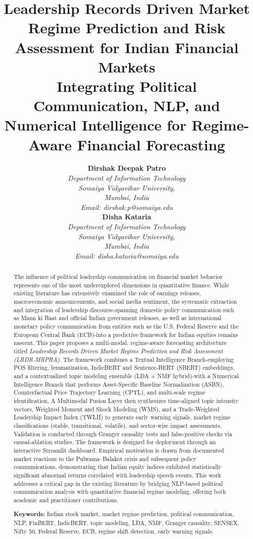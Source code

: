 \documentclass[11pt]{article}
\title{\textbf{Leadership Records Driven Market Regime Prediction and Risk Assessment for Indian Financial Markets} \\ \large Integrating Political Communication, NLP, and Numerical Intelligence for Regime-Aware Financial Forecasting}
\author{
\begin{minipage}[t]{0.45\textwidth}
\centering
\textbf{Dirshak Deepak Patro}\\[2pt]
\textit{Department of Information Technology}\\
\textit{Somaiya Vidyavihar University,}\\
\textit{Mumbai, India}\\
\textit{Email: dirshak.p@somaiya.edu}
\end{minipage}
\hfill
\begin{minipage}[t]{0.45\textwidth}
\centering
\textbf{Disha Kataria}\\[2pt]
\textit{Department of Information Technology}\\
\textit{Somaiya Vidyavihar University,}\\
\textit{Mumbai, India}\\
\textit{Email: disha.kataria@somaiya.edu}
\end{minipage}
}
\begin{document}
\maketitle

\begin{abstract}
The influence of political leadership communication on financial market behavior represents one of the most underexplored dimensions in quantitative finance. While existing literature has extensively examined the role of earnings releases, macroeconomic announcements, and social media sentiment, the systematic extraction and integration of leadership discourse-spanning domestic policy communication such as Mann ki Baat and official Indian government releases, as well as international monetary policy communication from entities such as the U.S. Federal Reserve and the European Central Bank (ECB)-into a predictive framework for Indian equities remains nascent. This paper proposes a multi-modal, regime-aware forecasting architecture titled \textit{Leadership Records Driven Market Regime Prediction and Risk Assessment (LRDR-MRPRA)}. The framework combines a Textual Intelligence Branch-employing POS filtering, lemmatization, IndicBERT and Sentence-BERT (SBERT) embeddings, and a contextualized topic modeling ensemble (LDA + NMF hybrid)-with a Numerical Intelligence Branch that performs Asset-Specific Baseline Normalization (ASBN), Counterfactual Price Trajectory Learning (CPTL), and multi-scale regime identification. A Multimodal Fusion Layer then synthesizes time-aligned topic intensity vectors, Weighted Moment and Shock Modeling (WMS), and a Trade-Weighted Leadership Impact Index (TWLII) to generate early warning signals, market regime classifications (stable, transitional, volatile), and sector-wise impact assessments. Validation is conducted through Granger causality tests and false-positive checks via causal-ablation studies. The framework is designed for deployment through an interactive Streamlit dashboard. Empirical motivation is drawn from documented market reactions to the Pulwama–Balakot crisis and subsequent policy communications, demonstrating that Indian equity indices exhibited statistically significant abnormal returns correlated with leadership speech events. This work addresses a critical gap in the existing literature by bridging NLP-based political communication analysis with quantitative financial regime modeling, offering both academic and practitioner contributions.

\vspace{5mm}
\noindent\textbf{Keywords:} Indian stock market, market regime prediction, political communication, NLP, FinBERT, IndicBERT, topic modeling, LDA, NMF, Granger causality, SENSEX, Nifty 50, Federal Reserve, ECB, regime shift detection, early warning signals.
\end{abstract}
\end{document}
